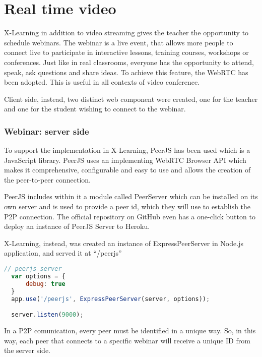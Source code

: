 \newpage
\section{Real time video}
\label{sec:RealTimeVideo}

X-Learning in addition to video streaming gives the teacher the opportunity to schedule webinars.
The webinar is a live event, that allows more people to connect live to participate in interactive lessons, training courses, workshops or conferences. Just like in real classrooms, everyone has the opportunity to attend, speak, ask questions and share ideas.
To achieve this feature, the WebRTC has been adopted. This is useful in all contexts of video conference.


Client side, instead, two distinct web component were created, one for the teacher and one for the student wishing to connect to the webinar.

\subsubsection{Webinar: server side}
To support the implementation in X-Learning, PeerJS has been used which is a JavaScript library.
PeerJS uses an implementing WebRTC Browser API which makes it comprehensive, configurable and easy to use and allows the creation of the peer-to-peer connection. 



PeerJS includes within it a module called PeerServer which can be installed on its own server and is used to provide a peer id, which they will use to establish the P2P connection. The official repository on GitHub even has a one-click button to deploy an instance of PeerJS Server to Heroku.

X-Learning, instead, was created an instance of ExpressPeerServer in Node.js application, and served it at “/peerjs”

\begin{lstlisting}[language=javascript]
// peerjs server
  var options = {
      debug: true
  }
  app.use('/peerjs', ExpressPeerServer(server, options));

  server.listen(9000);
\end{lstlisting}
In a P2P comunication, every peer must be identified in a unique way. So, in this way, each peer that connects to a specific webinar will receive a unique ID from the server side.

